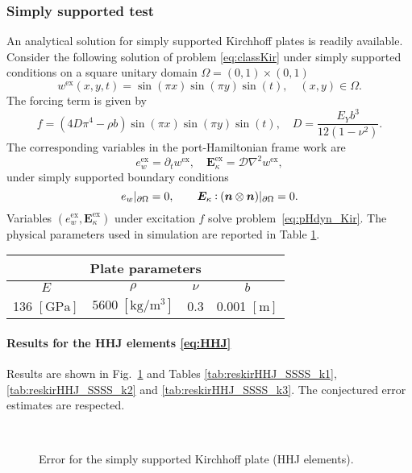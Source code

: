 \subsubsection{Simply supported test}
An analytical solution for simply supported Kirchhoff plates is readily available. Consider the following solution of problem \eqref{eq:classKir} under simply supported conditions on a square unitary domain $\Omega = (0,1)\times (0,1)$
\[
w^{\text{ex}}(x,y,t) = \sin(\pi x) \sin(\pi y) \sin(t), \quad  (x, y) \in \Omega.
\] 
The forcing term is given by  
\[
f = (4 D \pi^4 - \rho b) \sin(\pi x) \sin(\pi y) \sin(t), \quad D = \frac{E_Y b^3}{12 (1-\nu^2)}.
\]
The corresponding variables in the port-Hamiltonian frame work are
\[
e_w^{\text{ex}} = \partial_t w^{\text{ex}}, \quad \bm{E}_\kappa^{\text{ex}} = \mathcal{D} \nabla^2 w^{\text{ex}},
\]
under simply supported boundary conditions
\[
e_w\vert_{\partial\Omega} = 0, \qquad \bm{E}_\kappa \cddot (\bm{n} \otimes \bm{n})\vert_{\partial\Omega} = 0.
\]
Variables $(e_w^{\text{ex}}, \bm{E}_\kappa^{\text{ex}})$ under excitation $f$ solve problem~\eqref{eq:pHdyn_Kir}. The physical parameters used in simulation are reported in Table \ref{tab:parKir}. 

\begin{table}[htbp]
	\centering
	\begin{tabular}{cccc}
		\hline 
		\multicolumn{4}{c}{Plate parameters} \\ 
		\hline 
		$E$ & $\rho$ & $\nu$  & $b$ \\
		136 $[\textrm{GPa}]$ & $5600\; [\textrm{kg}/\textrm{m}^3]$ & 0.3 &  0.001 $[\textrm{m}]$\\ 
		\hline 
	\end{tabular} 
	\captionsetup{width=0.95\linewidth}
	\vspace{1mm}
	\label{tab:parKir}
\end{table}


\paragraph{Results for the HHJ elements \eqref{eq:HHJ}}
Results are shown in Fig.~\ref{fig:errorHHJ_SSSS} and Tables \ref{tab:reskirHHJ_SSSS_k1}, \ref{tab:reskirHHJ_SSSS_k2} and \ref{tab:reskirHHJ_SSSS_k3}. The conjectured error estimates are respected.

\begin{figure}[htbp]%
	\centering
	\hspace{8pt}%
	 \\
	\caption{Error for the simply supported Kirchhoff plate (HHJ elements).}%
	\label{fig:errorHHJ_SSSS}%
\end{figure}



